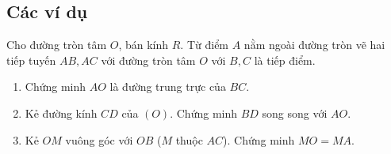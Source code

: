 \subsection{Các ví dụ}

\begin{vd}
	Cho đường tròn tâm $O$, bán kính $R$. Từ điểm $A$ nằm ngoài đường tròn vẽ hai tiếp tuyến $AB, AC$ với đường tròn tâm $O$ với $B,C$ là tiếp điểm.
	\begin{enumerate}
		\item Chứng minh $AO$ là đường trung trực của $BC$.
		\item Kẻ đường kính $CD$ của $(O)$. Chứng minh $BD$ song song với $AO$.
		\item Kẻ $OM$ vuông góc với $OB$ ($M$ thuộc $AC$). Chứng minh $MO=  MA$.
	\end{enumerate}
\end{vd}
